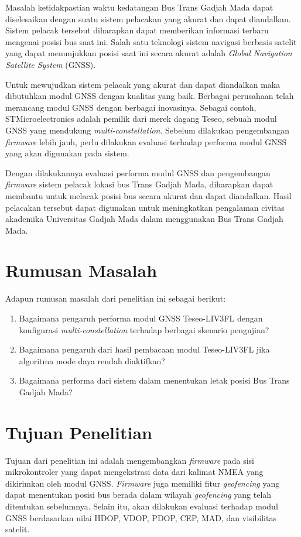 Masalah ketidakpastian waktu kedatangan Bus Trans Gadjah Mada dapat diselesaikan dengan suatu sistem pelacakan yang akurat dan dapat diandalkan. Sistem pelacak tersebut diharapkan dapat memberikan informasi terbaru mengenai posisi bus saat ini. Salah satu teknologi sistem navigasi berbasis satelit yang dapat menunjukkan posisi saat ini secara akurat adalah \textit{Global Navigation Satellite System} (GNSS).

Untuk mewujudkan sistem pelacak yang akurat dan dapat diandalkan maka dibutuhkan modul GNSS dengan kualitas yang baik. Berbagai perusahaan telah merancang modul GNSS dengan berbagai inovasinya. Sebagai contoh, STMicroelectronics adalah pemilik dari merek dagang Teseo, sebuah modul GNSS yang mendukung \textit{multi-constellation}. Sebelum dilakukan pengembangan \textit{firmware} lebih jauh, perlu dilakukan evaluasi terhadap performa modul GNSS yang akan digunakan pada sistem.

Dengan dilakukannya evaluasi performa modul GNSS dan pengembangan \textit{firmware} sistem pelacak lokasi bus Trans Gadjah Mada, diharapkan dapat membantu untuk melacak posisi bus secara akurat dan dapat diandalkan. Hasil pelacakan tersebut dapat digunakan untuk meningkatkan pengalaman civitas akademika Universitas Gadjah Mada dalam menggunakan Bus Trans Gadjah Mada.

\section{Rumusan Masalah}
Adapun rumusan masalah dari penelitian ini sebagai berikut:
\begin{enumerate}
	\item Bagaimana pengaruh performa modul GNSS Teseo\hyp{}LIV3FL dengan konfigurasi \textit{multi-constellation} terhadap berbagai skenario pengujian?
	\item Bagaimana pengaruh dari hasil pembacaan modul Teseo\hyp{}LIV3FL jika algoritma mode daya rendah diaktifkan?
	\item Bagaimana performa dari sistem dalam menentukan letak posisi Bus Trans Gadjah Mada?
\end{enumerate}

\section{Tujuan Penelitian}
Tujuan dari penelitian ini adalah mengembangkan \textit{firmware} pada sisi mikrokontroler yang dapat mengekstrasi data dari kalimat NMEA yang dikirimkan oleh modul GNSS. \textit{Firmware} juga memiliki fitur \textit{geofencing} yang dapat menentukan posisi bus berada dalam wilayah \textit{geofencing} yang telah ditentukan sebelumnya. Selain itu, akan dilakukan evaluasi terhadap modul GNSS berdasarkan nilai HDOP, VDOP, PDOP, CEP, MAD, dan visibilitas satelit.

